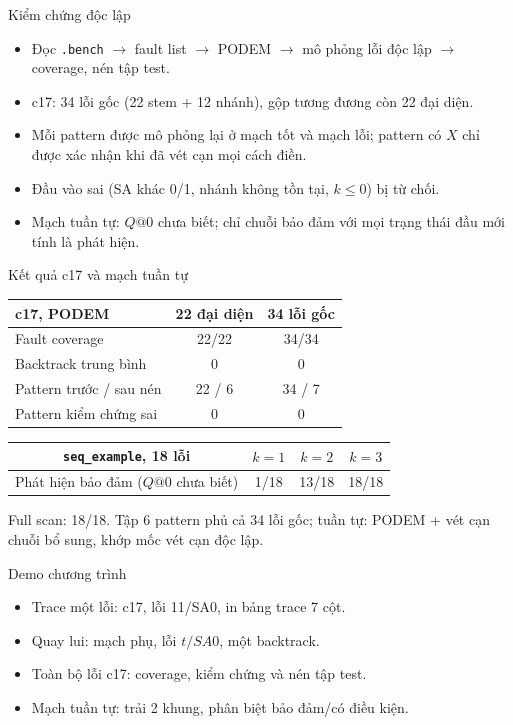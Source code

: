 \begin{frame}{Kiểm chứng độc lập}
\small
\begin{itemize}
  \item Đọc \texttt{.bench} $\rightarrow$ fault list $\rightarrow$ PODEM $\rightarrow$
        mô phỏng lỗi độc lập $\rightarrow$ coverage, nén tập test.
  \item c17: 34 lỗi gốc (22 stem + 12 nhánh), gộp tương đương còn 22 đại diện.
  \item Mỗi pattern được mô phỏng lại ở mạch tốt và mạch lỗi; pattern có $X$ chỉ
        được xác nhận khi đã vét cạn mọi cách điền.
  \item Đầu vào sai (SA khác 0/1, nhánh không tồn tại, $k\le 0$) bị từ chối.
  \item Mạch tuần tự: $Q@0$ chưa biết; chỉ chuỗi bảo đảm với mọi trạng thái đầu
        mới tính là phát hiện.
\end{itemize}
\end{frame}

\begin{frame}{Kết quả c17 và mạch tuần tự}
\small
\begin{center}
\begin{tabular}{@{}lcc@{}}
\toprule
c17, PODEM & 22 đại diện & 34 lỗi gốc\\
\midrule
Fault coverage & 22/22 & 34/34\\
Backtrack trung bình & 0 & 0\\
Pattern trước / sau nén & 22 / 6 & 34 / 7\\
Pattern kiểm chứng sai & 0 & 0\\
\bottomrule
\end{tabular}

\vspace{2mm}
\begin{tabular}{@{}cccc@{}}
\toprule
\texttt{seq\_example}, 18 lỗi & $k=1$ & $k=2$ & $k=3$\\
\midrule
Phát hiện bảo đảm ($Q@0$ chưa biết) & 1/18 & 13/18 & 18/18\\
\bottomrule
\end{tabular}
\end{center}
\footnotesize Full scan: 18/18. Tập 6 pattern phủ cả 34 lỗi gốc; tuần tự: PODEM + vét cạn chuỗi bổ sung, khớp mốc vét cạn độc lập.
\end{frame}

\begin{frame}{Demo chương trình}
\small
\begin{itemize}
  \item Trace một lỗi: c17, lỗi 11/SA0, in bảng trace 7 cột.
  \item Quay lui: mạch phụ, lỗi $t/SA0$, một backtrack.
  \item Toàn bộ lỗi c17: coverage, kiểm chứng và nén tập test.
  \item Mạch tuần tự: trải 2 khung, phân biệt bảo đảm/có điều kiện.
\end{itemize}
\end{frame}

